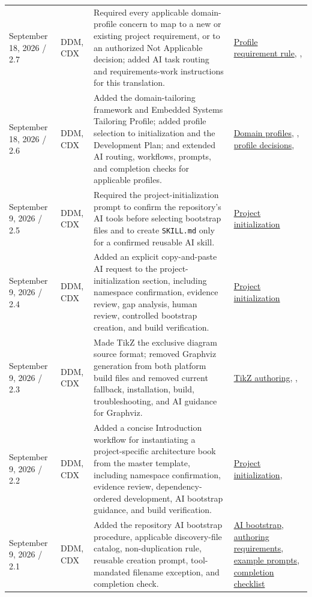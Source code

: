 \begin{tabularx}{\linewidth}{L{3.1cm}L{2.2cm}YL{2.0cm}}
September 18, 2026 / 2.7 & DDM, CDX & Required every applicable domain-profile concern to map to a new or existing project requirement, or to an authorized Not Applicable decision; added AI task routing and requirements-work instructions for this translation. & \hyperref[Section:DomainProfileRequirements]{Profile requirement rule}, , \\
September 18, 2026 / 2.6 & DDM, CDX & Added the domain-tailoring framework and Embedded Systems Tailoring Profile; added profile selection to initialization and the Development Plan; and extended AI routing, workflows, prompts, and completion checks for applicable profiles. & \hyperref[Section:DomainProfiles]{Domain profiles}, , \hyperref[Section:DevelopmentPlanProfiles]{profile decisions}, \\
September 9, 2026 / 2.5 & DDM, CDX & Required the project-initialization prompt to confirm the repository's AI tools before selecting bootstrap files and to create \texttt{SKILL.md} only for a confirmed reusable AI skill. & \hyperref[Section:InitializeNewProject]{Project initialization}\\
September 9, 2026 / 2.4 & DDM, CDX & Added an explicit copy-and-paste AI request to the project-initialization section, including namespace confirmation, evidence review, gap analysis, human review, controlled bootstrap creation, and build verification. & \hyperref[Section:InitializeNewProject]{Project initialization}\\
September 9, 2026 / 2.3 & DDM, CDX & Made TikZ the exclusive diagram source format; removed Graphviz generation from both platform build files and removed current fallback, installation, build, troubleshooting, and AI guidance for Graphviz. & \hyperref[Section:TikZAuthoring]{TikZ authoring}, , \\
September 9, 2026 / 2.2 & DDM, CDX & Added a concise Introduction workflow for instantiating a project-specific architecture book from the master template, including namespace confirmation, evidence review, dependency-ordered development, AI bootstrap guidance, and build verification. & \hyperref[Section:InitializeNewProject]{Project initialization}, \\
September 9, 2026 / 2.1 & DDM, CDX & Added the repository AI bootstrap procedure, applicable discovery-file catalog, non-duplication rule, reusable creation prompt, tool-mandated filename exception, and completion check. & \hyperref[Section:AIRepositoryBootstrap]{AI bootstrap}, \hyperref[Table:DocumentAuthoringRequirements]{authoring requirements}, \hyperref[Section:AIExamplePrompts]{example prompts}, \hyperref[Table:AICompletionChecklist]{completion checklist}\\

\end{tabularx}
